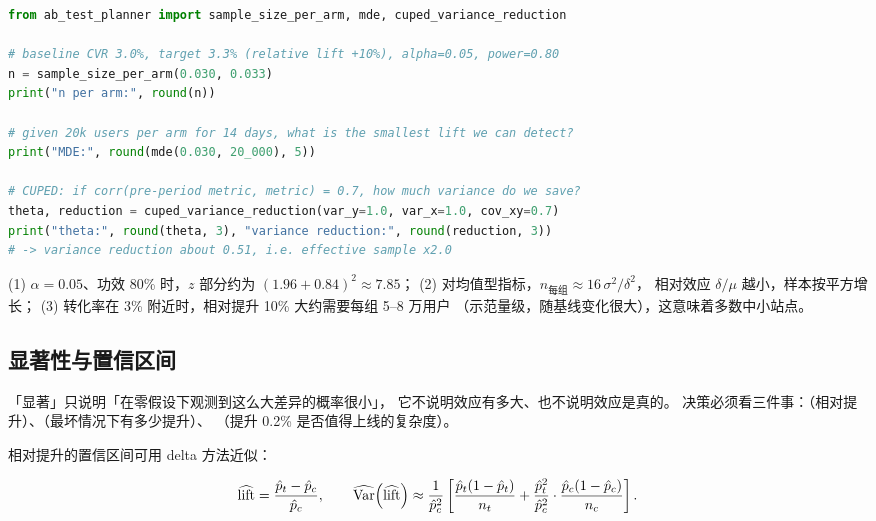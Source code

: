 \begin{lstlisting}[style=growthnoline, language=Python, caption={调用 ab\_test\_planner.py 估算样本量、MDE 与 CUPED 收益}]
from ab_test_planner import sample_size_per_arm, mde, cuped_variance_reduction

# baseline CVR 3.0%, target 3.3% (relative lift +10%), alpha=0.05, power=0.80
n = sample_size_per_arm(0.030, 0.033)
print("n per arm:", round(n))

# given 20k users per arm for 14 days, what is the smallest lift we can detect?
print("MDE:", round(mde(0.030, 20_000), 5))

# CUPED: if corr(pre-period metric, metric) = 0.7, how much variance do we save?
theta, reduction = cuped_variance_reduction(var_y=1.0, var_x=1.0, cov_xy=0.7)
print("theta:", round(theta, 3), "variance reduction:", round(reduction, 3))
# -> variance reduction about 0.51, i.e. effective sample x2.0
\end{lstlisting}

\begin{formulacard}[样本量的三个速算记忆点]
(1) $\alpha = 0.05$、功效 80\% 时，$z$ 部分约为 $(1.96 + 0.84)^{2} \approx 7.85$；
(2) 对均值型指标，$n_{\text{每组}} \approx 16\,\sigma^{2}/\delta^{2}$，
相对效应 $\delta/\mu$ 越小，样本按平方增长；
(3) 转化率在 3\% 附近时，相对提升 10\% 大约需要每组 5--8 万用户
（示范量级，随基线变化很大），这意味着多数中小站点。
\end{formulacard}

\subsection{显著性与置信区间}

「显著」只说明「在零假设下观测到这么大差异的概率很小」，
它不说明效应有多大、也不说明效应是真的。
决策必须看三件事：（相对提升）、（最坏情况下有多少提升）、
（提升 0.2\% 是否值得上线的复杂度）。

相对提升的置信区间可用 delta 方法近似：

\begin{equation}
\widehat{\text{lift}} = \frac{\hat p_t - \hat p_c}{\hat p_c},
\qquad
\widehat{\operatorname{Var}}\!\left(\widehat{\text{lift}}\right) \approx
\frac{1}{\hat p_c^{2}}\left[
\frac{\hat p_t(1-\hat p_t)}{n_t}
+ \frac{\hat p_t^{2}}{\hat p_c^{2}}\cdot\frac{\hat p_c(1-\hat p_c)}{n_c}
\right] .
\label{eq:growth-lift-ci}
\end{equation}

